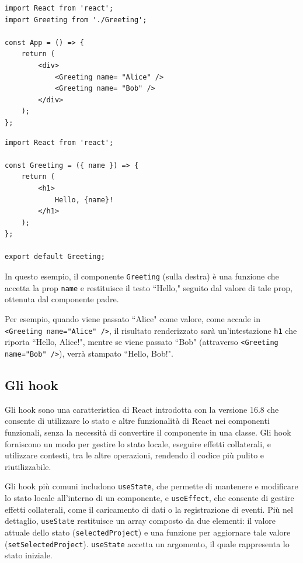 \documentclass[target=bach,aauheader=,style=]{thud}
\begin{document}
\begin{minipage}[t]{0.45\textwidth}
    \begin{lstlisting}[caption=Componente padre]
import React from 'react';
import Greeting from './Greeting';

const App = () => {
    return (
        <div>
            <Greeting name= "Alice" />
            <Greeting name= "Bob" />
        </div>
    );
};  
    \end{lstlisting}
\end{minipage}
\hfill
\begin{minipage}[t]{0.45\textwidth}
    \begin{lstlisting}[caption=Componente figlio]
import React from 'react';

const Greeting = ({ name }) => {
    return (
        <h1>
            Hello, {name}!
        </h1>
    );
};

export default Greeting;
    \end{lstlisting}
\end{minipage}

\noindent In questo esempio, il componente \texttt{Greeting} (sulla destra) è una funzione che accetta la prop \texttt{name} e restituisce il testo  ``Hello," seguito dal valore di tale prop, ottenuta dal componente padre. 

\noindent Per esempio, quando viene passato ``Alice" come valore, come accade in \texttt{<Greeting name="Alice" />}, il risultato renderizzato sarà un'intestazione \texttt{h1} che riporta ``Hello, Alice!", mentre se viene passato ``Bob" (attraverso \texttt{<Greeting name="Bob" />}), verrà stampato ``Hello, Bob!".

\subsection{Gli hook}
Gli hook sono una caratteristica di React introdotta con la versione 16.8 che consente di utilizzare lo stato e altre funzionalità di React nei componenti funzionali, senza la necessità di convertire il componente in una classe. Gli hook forniscono un modo per gestire lo stato locale, eseguire effetti collaterali, e utilizzare contesti, tra le altre operazioni, rendendo il codice più pulito e riutilizzabile. 

\noindent Gli hook più comuni includono \texttt{useState}, che permette di mantenere e modificare lo stato locale all'interno di un componente, e \texttt{useEffect}, che consente di gestire effetti collaterali, come il caricamento di dati o la registrazione di eventi. Più nel dettaglio, \texttt{useState} restituisce un array composto da due elementi: il valore attuale dello stato (\texttt{selectedProject}) e una funzione per aggiornare tale valore (\texttt{setSelectedProject}). \texttt{useState} accetta un argomento, il quale rappresenta lo stato iniziale.
\end{document}

